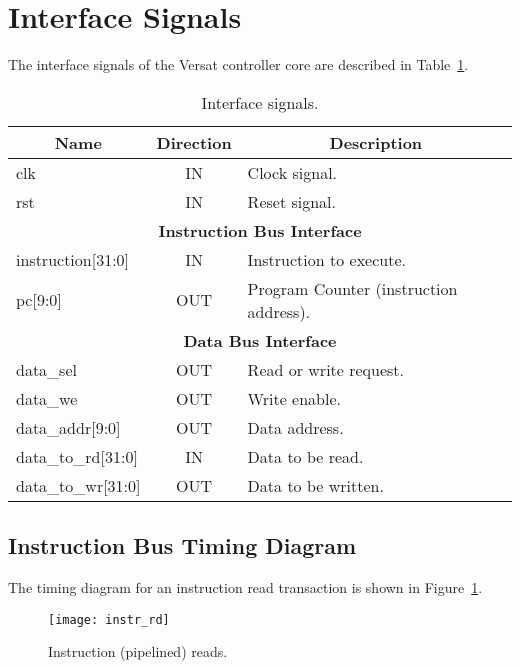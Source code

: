 \section{Interface Signals}
\label{sec:is}

The interface signals of the Versat controller core are described in Table~\ref{tab:is}.

\begin{table}[h]
\centering
\begin{tabular}{|l|c|l|}
\hline
\multicolumn{1}{|c|}{\bf Name} & {\bf Direction} & \multicolumn{1}{c|}{\bf Description} \\ 
\hline \hline
\multicolumn{1}{|l|}{clk}                & IN    & Clock signal.\\ 
\hline
\multicolumn{1}{|l|}{rst}                & IN    & \multicolumn{1}{l|}{Reset signal.}\\
\hline \hline
\multicolumn{3}{|c|}{{\bf Instruction Bus Interface}}\\ 
\hline \hline
instruction[31:0]                        & IN    & Instruction to execute.\\ 
\hline
pc[9:0]                                  & OUT   & Program Counter (instruction address).\\ 
\hline \hline
\multicolumn{3}{|c|}{{\bf Data Bus Interface}}\\ 
\hline \hline
data\_sel                                & OUT   & Read or write request.\\ 
\hline
data\_we                                 & OUT   & Write enable.\\ 
\hline
data\_addr[9:0]                          & OUT   & Data address.\\ 
\hline
data\_to\_rd[31:0]                       & IN    & Data to be read.\\ 
\hline
data\_to\_wr[31:0]                       & OUT   & Data to be written. \\ 
\hline
\end{tabular}
\caption{Interface signals.}
\label{tab:is}
\end{table}

\subsection{Instruction Bus Timing Diagram}
\label{sec:instrird}

The timing diagram for an instruction read transaction is shown in
Figure~\ref{fig:instrird}.

\begin{figure}[htbp]
    \centerline{\texttt{[image: instr\_rd]}}
    \vspace{0cm}\caption{Instruction (pipelined) reads.}
    \label{fig:instrird}
\end{figure}

